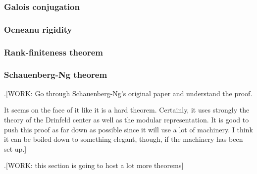 \subsubsection{Galois conjugation}

\subsubsection{Ocneanu rigidity}

\subsubsection{Rank-finiteness theorem}

\subsubsection{Schauenberg-Ng theorem}

.[WORK: Go through Schauenberg-Ng's original paper and understand the proof.

It seems on the face of it like it is a hard theorem. Certainly, it uses strongly the theory of the Drinfeld center as well as the modular representation. It is good to push this proof as far down as possible since it will use a lot of machinery. I think it can be boiled down to something elegant, though, if the machinery has been set up.]


.[WORK: this section is going to host a lot more theorems]



